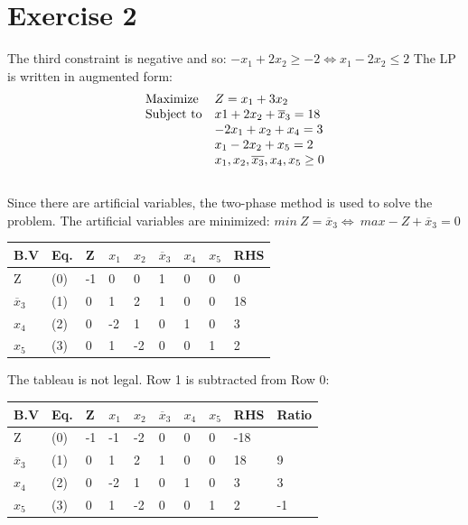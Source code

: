 \documentclass{article}
\begin{document}
\section{Exercise 2} %

The third constraint is negative and so: $-x_1+2x_2\geq -2 \Longleftrightarrow x_1-2x_2\leq 2$
The LP is written in augmented form:
\\
\begin{equation*}
    \begin{array}{ll@{}ll}
    \text{Maximize}  & Z=x_1+3x_2&\\
    \text{Subject to}& x1+2x_2+\overline{x}_3 =18\\
                     & -2x_1+x_2+x_4=3\\
                     & x_1-2x_2+x_5=2\\
                     & x_1, x_2, \overline{x_3}, x_4, x_5\geq 0
\end{array}
\end{equation*}
\\
Since there are artificial variables, the two-phase method is used to solve the problem.
The artificial variables are minimized: $min\ Z=\overline{x}_3 \Longleftrightarrow\ max -Z+\overline{x}_3=0$

\vspace{5mm}
\begin{tabular}{|l|l|l|l l l l l|l|}
  \hline
  B.V             & Eq. & Z & $x_1$ & $x_2$ & $\overline{x}_3$ & $x_4$ & $x_5$  & RHS\\ \hline
  Z               & (0) & -1& 0  & 0  & 1  & 0  & 0   & 0  \\ \hline
  $\overline{x}_3$& (1) & 0 & 1  & 2  & 1  & 0  & 0   & 18 \\ \hline
  $x_4$           & (2) & 0 & -2 & 1  & 0  & 1  & 0   & 3  \\ \hline
  $x_5$& (3) & 0 & 1  & -2 & 0  & 0  & 1   & 2 \\ \hline
\end{tabular}

\vspace{5mm}
The tableau is not legal. Row 1 is subtracted from Row 0: 

\vspace{5mm}
\begin{tabular}{|l|l|l|l l l l l|l|l|}
  \hline
  B.V             & Eq. & Z & $x_1$ & $x_2$ & $\overline{x}_3$ & $x_4$ & $x_5$  & RHS & Ratio\\ \hline
  Z               & (0) & -1& -1 & -2 & 0  & 0  & 0   & -18 & \\ \hline
  $\overline{x}_3$& (1) & 0 & 1  & 2  & 1  & 0  & 0   & 18  & 9 \\ \hline
  $x_4$           & (2) & 0 & -2 & 1  & 0  & 1  & 0   & 3   & 3 \\ \hline
  $x_5$           & (3) & 0 & 1  & -2 & 0  & 0  & 1   & 2   & -1\\ \hline
\end{tabular}
\end{document}
